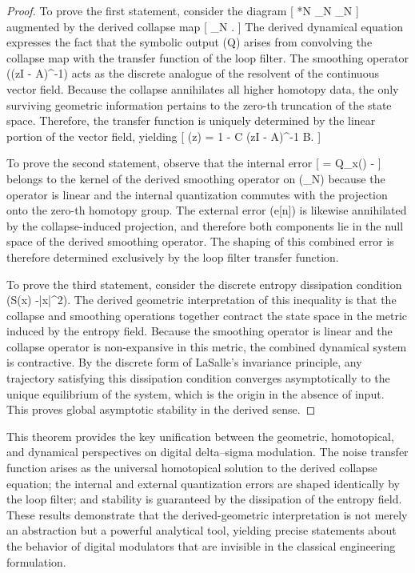 \begin{proof}
To prove the first statement, consider the diagram
[
*N  \Lambda {} _N  _N
]
augmented by the derived collapse map
[
_N  \Lambda \xrightarrow{\iota} .
]
The derived dynamical equation expresses the fact that the symbolic output (\iota \circ Q) arises from convolving the collapse map with the transfer function of the loop filter. The smoothing operator ((zI - A)^{-1}) acts as the discrete analogue of the resolvent of the continuous vector field. Because the collapse annihilates all higher homotopy data, the only surviving geometric information pertains to the zero-th truncation of the state space. Therefore, the transfer function is uniquely determined by the linear portion of the vector field, yielding
[
(z) = 1 - C (zI - A)^{-1} B.
]

To prove the second statement, observe that the internal error
[
\epsilon[n] = Q_x(\cdot) - 
]
belongs to the kernel of the derived smoothing operator on (_N) because the operator is linear and the internal quantization commutes with the projection onto the zero-th homotopy group. The external error (e[n]) is likewise annihilated by the collapse-induced projection, and therefore both components lie in the null space of the derived smoothing operator. The shaping of this combined error is therefore determined exclusively by the loop filter transfer function.

To prove the third statement, consider the discrete entropy dissipation condition (\Delta S(x) \le -\gamma |x|^2). The derived geometric interpretation of this inequality is that the collapse and smoothing operations together contract the state space in the metric induced by the entropy field. Because the smoothing operator is linear and the collapse operator is non-expansive in this metric, the combined dynamical system is contractive. By the discrete form of LaSalle's invariance principle, any trajectory satisfying this dissipation condition converges asymptotically to the unique equilibrium of the system, which is the origin in the absence of input. This proves global asymptotic stability in the derived sense.
\end{proof}

This theorem provides the key unification between the geometric, homotopical, and dynamical perspectives on digital delta--sigma modulation. The noise transfer function arises as the universal homotopical solution to the derived collapse equation; the internal and external quantization errors are shaped identically by the loop filter; and stability is guaranteed by the dissipation of the entropy field. These results demonstrate that the derived-geometric interpretation is not merely an abstraction but a powerful analytical tool, yielding precise statements about the behavior of digital modulators that are invisible in the classical engineering formulation.


